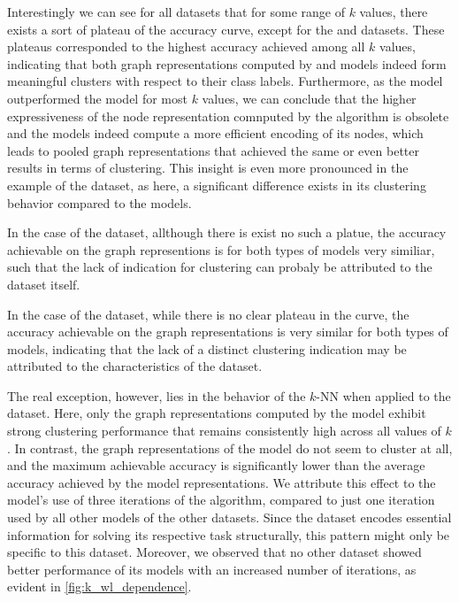 Interestingly we can see for all datasets that for some range of $k$ values, there exists a sort of plateau of the accuracy curve, except for the \enzymes and \nci datasets. These plateaus corresponded to the highest accuracy achieved among all $k$ values, indicating that both graph representations computed by \wlnn and \gnn models indeed form meaningful clusters with respect to their class labels. Furthermore, as the \gnn model outperformed the \wlnn model for most $k$ values, we can conclude that the higher expressiveness of the node representation comnputed by the \wl algorithm is obsolete and the \gnn models indeed compute a more efficient encoding of its nodes, which leads to pooled graph representations that achieved the same or even better results in terms of clustering. This insight is even more pronounced in the example of the \reddit dataset, as here, a significant difference exists in its clustering behavior compared to the \wlnn models.

In the case of the \enzymes dataset, allthough there is exist no such a platue, the accuracy achievable on the graph representions is for both types of models very similiar, such that the lack of indication for clustering can probaly be attributed to the dataset itself.

In the case of the \enzymes dataset, while there is no clear plateau in the curve, the accuracy achievable on the graph representations is very similar for both types of models, indicating that the lack of a distinct clustering indication may be attributed to the characteristics of the dataset.

The real exception, however, lies in the behavior of the \textsf{$k$-NN} when applied to the \nci dataset. Here, only the graph representations computed by the \wlnn model exhibit strong clustering performance that remains consistently high across all values of $k$. In contrast, the graph representations of the \gnn model do not seem to cluster at all, and the maximum achievable accuracy is significantly lower than the average accuracy achieved by the \wlnn model representations. We attribute this effect to the \wlnn model's use of three iterations of the \wl algorithm, compared to just one iteration used by all other models of the other datasets. Since the \nci dataset encodes essential information for solving its respective task structurally, this pattern might only be specific to this dataset. Moreover, we observed that no other dataset showed better performance of its \wlnn models with an increased number of \wl iterations, as evident in \cref{fig:k_wl_dependence}.


